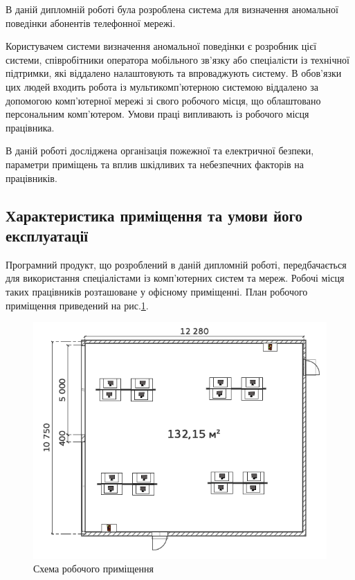 \newpage
{}
    В даній дипломній роботі була розроблена система для визначення аномальної поведінки абонентів телефонної мережі.

    Користувачем системи визначення аномальної поведінки є розробник цієї системи, співробітники оператора мобільного зв'язку або спеціалісти із технічної підтримки, які віддалено налаштовують та впроваджують систему. В обов'язки цих людей входить робота із мультикомп'ютерною системою віддалено за допомогою комп'ютерної мережі зі свого робочого місця, що облаштовано персональним комп'ютером. Умови праці випливають із робочого місця працівника.

    В даній роботі досліджена організація пожежної та електричної безпеки, параметри приміщень та вплив шкідливих та небезпечних факторів на працівників.
    
\subsection{Характеристика приміщення та умови його експлуатації}
    Програмний продукт, що розроблений в даній дипломній роботі, передбачається для використання спеціалістами із комп'ютерних систем та мереж. Робочі місця таких працівників розташоване у офісному приміщенні. План робочого приміщення приведений на рис.\ref{fig:lab-plan}.
    \begin{figure}[h!]
            \begin{center}
                \includegraphics[scale=0.7]{labour/lab-plan.png}
            \end{center}
            \caption{Схема робочого приміщення}
            \label{fig:lab-plan}
    \end{figure}

